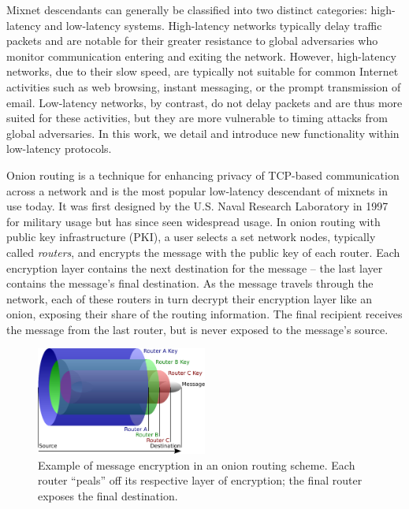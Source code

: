 Mixnet descendants can generally be classified into two distinct categories: high-latency and low-latency systems. High-latency networks typically delay traffic packets and are notable for their greater resistance to global adversaries who monitor communication entering and exiting the network. However, high-latency networks, due to their slow speed, are typically not suitable for common Internet activities such as web browsing, instant messaging, or the prompt transmission of email. Low-latency networks, by contrast, do not delay packets and are thus more suited for these activities, but they are more vulnerable to timing attacks from global adversaries.\cite{dingledine2004tor} In this work, we detail and introduce new functionality within low-latency protocols.

Onion routing is a technique for enhancing privacy of TCP-based communication across a network and is the most popular low-latency descendant of mixnets in use today. It was first designed by the U.S. Naval Research Laboratory in 1997 for military usage \cite{syverson1997anonymous}\cite{reed1998anonymous} but has since seen widespread usage. In onion routing with public key infrastructure (PKI), a user selects a set network nodes, typically called \emph{routers}, and encrypts the message with the public key of each router. Each encryption layer contains the next destination for the message -- the last layer contains the message's final destination. As the message travels through the network, each of these routers in turn decrypt their encryption layer like an onion, exposing their share of the routing information. The final recipient receives the message from the last router, but is never exposed to the message's source.\cite{syverson2011peel} 

\begin{figure}[htbp]
	\centering
	\includegraphics[width=0.5\textwidth]{images/onion-diagram.eps}
	\caption{Example of message encryption in an onion routing scheme. Each router ``peals'' off its respective layer of encryption; the final router exposes the final destination.}
\end{figure}

